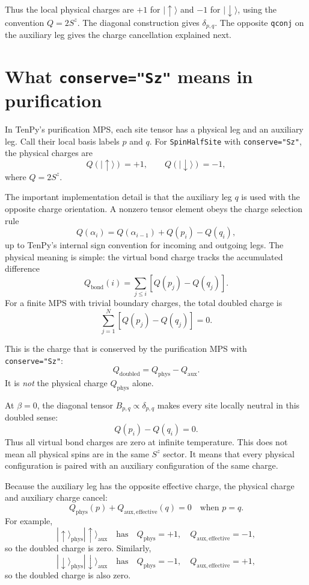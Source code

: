 \documentclass[11pt]{article}
\newcommand{\Q}{Q}
\begin{document}
Thus the local physical charges are \(+1\) for \(|\uparrow\rangle\) and
\(-1\) for \(|\downarrow\rangle\), using the convention \(\Q=2S^z\).
The diagonal construction gives \(\delta_{p,q}\). The opposite \texttt{qconj}
on the auxiliary leg gives the charge cancellation explained next.

\section{What \texttt{conserve="Sz"} means in purification}

In TenPy's purification MPS, each site tensor has a physical leg and an auxiliary
leg. Call their local basis labels \(p\) and \(q\). For \texttt{SpinHalfSite}
with \texttt{conserve="Sz"}, the physical charges are
\[
\Q(|\uparrow\rangle)=+1,\qquad
\Q(|\downarrow\rangle)=-1,
\]
where \(\Q=2S^z\).

The important implementation detail is that the auxiliary leg \(q\) is used with
the opposite charge orientation. A nonzero tensor element obeys the charge
selection rule
\[
\Q(\alpha_i)
=
\Q(\alpha_{i-1}) + \Q(p_i)-\Q(q_i),
\]
up to TenPy's internal sign convention for incoming and outgoing legs. The
physical meaning is simple: the virtual bond charge tracks the accumulated
difference
\[
\Q_{\mathrm{bond}}(i)
=
\sum_{j\le i}\left[\Q(p_j)-\Q(q_j)\right].
\]
For a finite MPS with trivial boundary charges, the total doubled charge is
\[
\sum_{j=1}^N \left[\Q(p_j)-\Q(q_j)\right]=0.
\]

This is the charge that is conserved by the purification MPS with
\texttt{conserve="Sz"}:
\[
\Q_{\mathrm{doubled}}
=
\Q_{\mathrm{phys}}-\Q_{\mathrm{aux}}.
\]
It is \emph{not} the physical charge \(\Q_{\mathrm{phys}}\) alone.

At \(\beta=0\), the diagonal tensor \(B_{p,q}\propto\delta_{p,q}\) makes every
site locally neutral in this doubled sense:
\[
\Q(p_i)-\Q(q_i)=0.
\]
Thus all virtual bond charges are zero at infinite temperature. This does not
mean all physical spins are in the same \(S^z\) sector. It means that every
physical configuration is paired with an auxiliary configuration of the same
charge.

Because the auxiliary leg has the opposite effective charge, the physical charge
and auxiliary charge cancel:
\[
\Q_{\mathrm{phys}}(p) + \Q_{\mathrm{aux, effective}}(q) = 0
\quad\text{when }p=q.
\]
For example,
\[
|\uparrow\rangle_{\mathrm{phys}}|\uparrow\rangle_{\mathrm{aux}}
\quad\text{has}\quad
\Q_{\mathrm{phys}}=+1,\quad
\Q_{\mathrm{aux,effective}}=-1,
\]
so the doubled charge is zero. Similarly,
\[
|\downarrow\rangle_{\mathrm{phys}}|\downarrow\rangle_{\mathrm{aux}}
\quad\text{has}\quad
\Q_{\mathrm{phys}}=-1,\quad
\Q_{\mathrm{aux,effective}}=+1,
\]
so the doubled charge is also zero.
\end{document}
